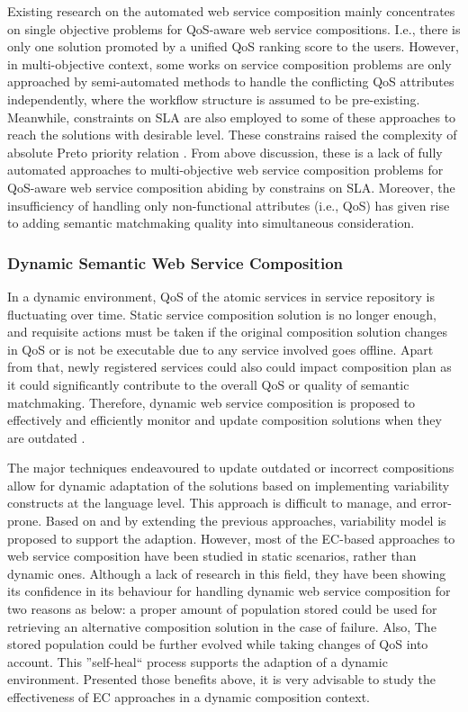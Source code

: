 Existing research on the automated web service composition mainly concentrates on single objective problems for QoS-aware web service compositions. I.e., there is only one solution promoted by a unified QoS ranking score to the users. However, in multi-objective context, some works  \cite{liu2005dynamic,wada2012e3,yao2009qos,yin2014hybrid} on service composition problems are only approached by semi-automated methods to handle the conflicting QoS attributes independently, where the workflow structure is assumed to be pre-existing. Meanwhile, constraints on SLA are also employed to some of these approaches to reach the solutions with desirable level. These constrains raised the complexity of absolute Preto priority relation \cite{garey1979guide}. From above discussion, these is a lack of fully automated approaches to multi-objective web service composition problems for QoS-aware web service composition abiding by constrains on SLA. Moreover, the insufficiency of handling only non-functional attributes (i.e., QoS) has given rise to adding semantic matchmaking quality into simultaneous consideration.

\subsubsection{Dynamic Semantic Web Service Composition}
In a  dynamic environment, QoS of the atomic services in service repository is fluctuating over time. Static service composition solution is no longer enough, and requisite actions must be taken if the original composition solution changes in QoS or is not be executable due to any service involved goes offline. Apart from that, newly registered services could also could impact composition plan as it could significantly contribute to the overall QoS or quality of semantic matchmaking. Therefore, dynamic web service composition is proposed to effectively and efficiently monitor and update composition solutions when they are outdated \cite{li2014fault}. 


The major techniques endeavoured to update outdated or incorrect compositions allow for dynamic adaptation of the solutions based on implementing variability constructs at the language level. This approach is difficult to manage, and error-prone.  Based on and by extending the previous approaches, variability model \cite{alferez2014dynamic} is proposed to support the adaption. However, most of the EC-based approaches to web service composition have been studied in static scenarios, rather than dynamic ones. Although a lack of research in this field, they have been showing its confidence in its behaviour for handling dynamic web service composition for two reasons as below: a proper amount of population stored could be used for retrieving an alternative composition solution in the case of failure. Also, The stored population could be further evolved while taking changes of QoS into account. This ''self-heal`` process supports the adaption of a dynamic environment. Presented those benefits above, it is very advisable to study the effectiveness of EC approaches in a dynamic composition context.


